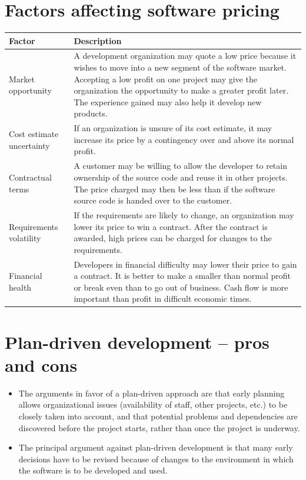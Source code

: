 \newpage
\section{Factors affecting software pricing}
\begin{table}[h!]
\centering
\begin{tabular}{ |p{3cm}|p{8cm}|  }
\hline
Factor & Description \\
\hline
\hline
Market opportunity & A development organization may quote a low price because it wishes to move into a new segment of the software market. Accepting a low profit on one project may give the organization the opportunity to make a greater profit later. The experience gained may also help it develop new products.\\
\hline
Cost estimate uncertainty & If an organization is unsure of its cost estimate, it may increase its price by a contingency over and above its normal profit.\\
\hline
Contractual terms & A customer may be willing to allow the developer to retain ownership of the source code and reuse it in other projects. The price charged may then be less than if the software source code is handed over to the customer.\\
\hline
Requirements volatility & If the requirements are likely to change, an organization may lower its price to win a contract. After the contract is awarded, high prices can be charged for changes to the requirements.\\
\hline
Financial health & Developers in financial difficulty may lower their price to gain a contract. It is better to make a smaller than normal profit or break even than to go out of business. Cash flow is more important than profit in difficult economic times.\\

\hline
\end{tabular}

\label{table:T6_1}
\end{table}

\section{Plan-driven development – pros and cons}
\begin{itemize}

\item The arguments in favor of a plan-driven approach are that early planning allows organizational issues (availability of staff, other projects, etc.) to be closely taken into account, and that potential problems and dependencies are discovered before the project starts, rather than once the project is underway.

\item The principal argument against plan-driven development is that many early decisions have to be revised because of changes to the environment in which the software is to be developed and used.
\end{itemize}
